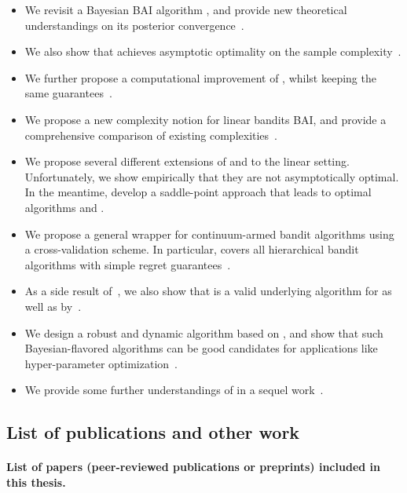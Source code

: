 \begin{itemize}[label=]
    \item We revisit a Bayesian BAI algorithm \TTTS, and provide new theoretical understandings on its posterior convergence~\citep{shang2020t3c}.
    \item We also show that \TTTS achieves asymptotic optimality on the sample complexity~\citep{shang2020t3c}.
    \item We further propose a computational improvement \TCC of \TTTS, whilst keeping the same guarantees~\citep{shang2020t3c}.
    \item We propose a new complexity notion for linear bandits BAI, and provide a comprehensive comparison of existing complexities~\citep{degenne2020game}.
    \item We propose several different extensions of \TTTS and \TCC to the linear setting. Unfortunately, we show empirically that they are not asymptotically optimal. In the meantime, \cite{degenne2020game} develop a saddle-point approach that leads to optimal algorithms \LG and \LGC.
    \item We propose a general wrapper \GPO for continuum-armed bandit algorithms using a cross-validation scheme. In particular, \GPO covers all hierarchical bandit algorithms with simple regret guarantees~\citep{shang2019adaptive}.
    \item As a side result of~\cite{shang2019adaptive}, we also show that \HCT is a valid underlying algorithm for \GPO as well as \POO by~\cite{grill2015poo}.
    \item We design a robust and dynamic algorithm \DTTTS based on \TTTS, and show that such Bayesian-flavored algorithms can be good candidates for applications like hyper-parameter optimization~\citep{shang2019dttts}.
    \item We provide some further understandings of \DTTTS in a sequel work~\citep{shang2020dttts}.
\end{itemize}

\subsection{List of publications and other work}\label{sec:intro.contributions.list}

\paragraph{List of papers (peer-reviewed publications or preprints) included in this thesis.}

